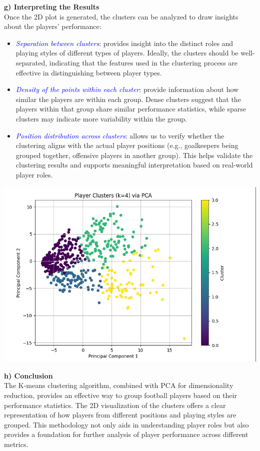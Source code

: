 \documentclass[a4paper,12pt]{article}
\begin{document}
\textbf{g) Interpreting the Results} \\
Once the 2D plot is generated, the clusters can be analyzed to draw insights about the players’ performance:
\begin{itemize}
    \item \textit{\textcolor{blue}{Separation between clusters}}: provides insight into the distinct roles and playing styles of different types of players. Ideally, the clusters should be well-separated, indicating that the features used in the clustering process are effective in distinguishing between player types.
    \item \textit{\textcolor{blue}{Density of the points within each cluster}}: provide information about how similar the players are within each group. Dense clusters suggest that the players within that group share similar performance statistics, while sparse clusters may indicate more variability within the group.
    \item \textit{\textcolor{blue}{Position distribution across clusters}}: allows us to verify whether the clustering aligns with the actual player positions (e.g., goalkeepers being grouped together, offensive players in another group). This helps validate the clustering results and supports meaningful interpretation based on real-world player roles.
\end{itemize}
\includegraphics[width=1\textwidth]{k=4.PNG}

\textbf{h) Conclusion} \\
The K-means clustering algorithm, combined with PCA for dimensionality reduction, provides an effective way to group football players based on their performance statistics. The 2D visualization of the clusters offers a clear representation of how players from different positions and playing styles are grouped. This methodology not only aids in understanding player roles but also provides a foundation for further analysis of player performance across different metrics.
\end{document}
